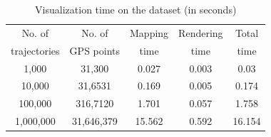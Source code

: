 \begin{table}
	\centering
	\small
	\caption{Visualization time on the \pt{} dataset (in seconds)}
	\vspace{-2mm}
    \trim
	\begin{tabular}{|c|c|c|c|c|} \hline
		No. of  & No. of & Mapping & Rendering & Total \\
         trajectories &  GPS points & time & time & time \\ \hline
		1,000& 31,300 & 0.027 & 0.003 & 0.03 \\ \hline
		10,000& 31,6531 & 0.169 & 0.005 & 0.174\\ \hline
		100,000& 316,7120 & 1.701 & 0.057 & 1.758 \\ \hline
		1,000,000& 31,646,379 & 15.562 & 0.592 & 16.154 \\ \hline
	\end{tabular}	\label{tab:gpu}
    \trim \trim 
\end{table}

